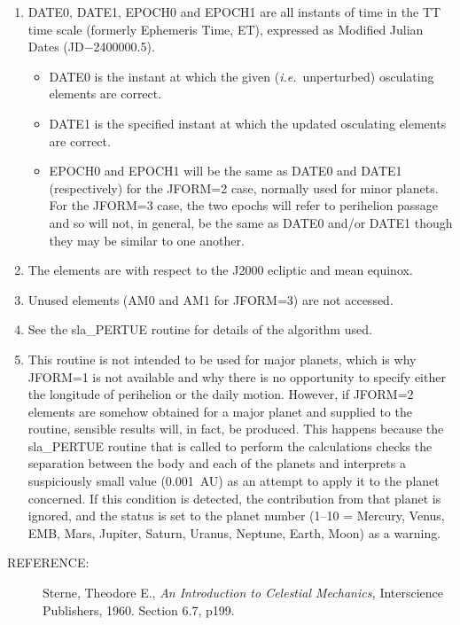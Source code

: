 \documentclass[11pt,twoside,nolof]{starlink}
\providecommand{\aref}[1]
{
   \begin{description}
     \item[REFERENCE:]
         #1
   \end{description}
}
\begin{document}
{\begin{enumerate}
 \item DATE0, DATE1, EPOCH0 and EPOCH1 are all instants of time in
       the TT time scale (formerly Ephemeris Time, ET), expressed
       as Modified Julian Dates (JD$-$2400000.5).
       \begin{itemize}
       \item DATE0 is the instant at which the given
             (\textit{i.e.}\ unperturbed) osculating elements are correct.
       \item DATE1 is the specified instant at which the updated osculating
             elements are correct.
       \item EPOCH0 and EPOCH1 will be the same as DATE0 and DATE1
             (respectively) for the JFORM=2 case, normally used for minor
             planets.  For the JFORM=3 case, the two epochs will refer to
             perihelion passage and so will not, in general, be the same as
             DATE0 and/or DATE1 though they may be similar to one another.
       \end{itemize}
 \item The elements are with respect to the J2000 ecliptic and mean equinox.
 \item Unused elements (AM0 and AM1 for JFORM=3) are not accessed.
 \item See the sla\_PERTUE routine for details of the algorithm used.
 \item This routine is not intended to be used for major planets, which
       is why JFORM=1 is not available and why there is no opportunity
       to specify either the longitude of perihelion or the daily
       motion.  However, if JFORM=2 elements are somehow obtained for a
       major planet and supplied to the routine, sensible results will,
       in fact, be produced.  This happens because the sla\_PERTUE routine
       that is called to perform the calculations checks the separation
       between the body and each of the planets and interprets a
       suspiciously small value (0.001~AU) as an attempt to apply it to
       the planet concerned.  If this condition is detected, the
       contribution from that planet is ignored, and the status is set to
       the planet number (1--10 = Mercury, Venus, EMB, Mars, Jupiter,
       Saturn, Uranus, Neptune, Earth, Moon) as a warning.
 \end{enumerate}
}
\aref{Sterne, Theodore E., \textit{An Introduction to Celestial Mechanics,}\/
      Interscience Publishers, 1960.  Section 6.7, p199.}
\end{document}
